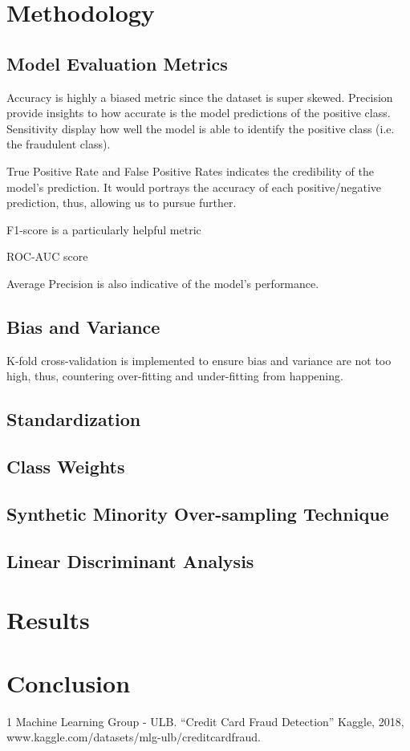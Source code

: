 \documentclass[12pt, letterpaper]{article}
\begin{document}
\section{Methodology}
    \subsection{Model Evaluation Metrics}
        Accuracy is highly a biased metric since the dataset is super skewed. Precision provide insights to how accurate is the model predictions of the positive class. Sensitivity display how well the model is able to identify the positive class (i.e. the fraudulent class).

        \par True Positive Rate and False Positive Rates indicates the credibility of the model's prediction. It would portrays the accuracy of each positive/negative prediction, thus, allowing us to pursue further.

        \par F1-score is a particularly helpful metric

        \par ROC-AUC score

        \par Average Precision is also indicative of the model's performance.

    \subsection{Bias and Variance}
        K-fold cross-validation is implemented to ensure bias and variance are not too high, thus, countering over-fitting and under-fitting from happening.

    \subsection{Standardization}
    
    \subsection{Class Weights}
    
    \subsection{Synthetic Minority Over-sampling Technique}
    
    \subsection{Linear Discriminant Analysis}
        
\section{Results}

\section{Conclusion}

\begin{thebibliography} {1}
    Machine Learning Group - ULB. “Credit Card Fraud Detection” Kaggle, 2018, www.kaggle.com/datasets/mlg-ulb/creditcardfraud.
    
\end{thebibliography}
    
\end{document}
